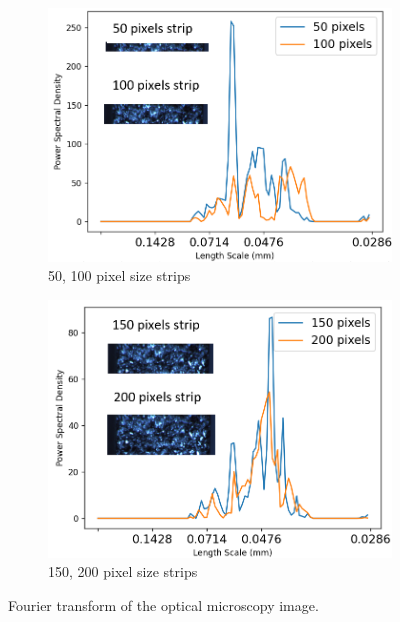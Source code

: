 \documentclass[11pt,a4paper]{article}
\begin{document}
\begin{figure} [ht]
\begin{subfigure}{0.52\textwidth}
\includegraphics[scale=0.55, center]{row100.png}
\caption{50, 100 pixel size strips}
\end{subfigure}
\begin{subfigure}{0.52\textwidth}
\includegraphics[scale=0.55, center]{row300.png}
\caption{150, 200 pixel size strips}
\end{subfigure}
\caption{Fourier transform of the optical microscopy image.} 
\label{fourier}
\end{figure}
\end{document}
